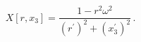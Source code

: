 \begin{equation}
X[r,x_3] = \frac{ 1-r^2 \omega^2}{(r^\prime)^2  + (x_3^\prime)^2} \,.
\end{equation}

